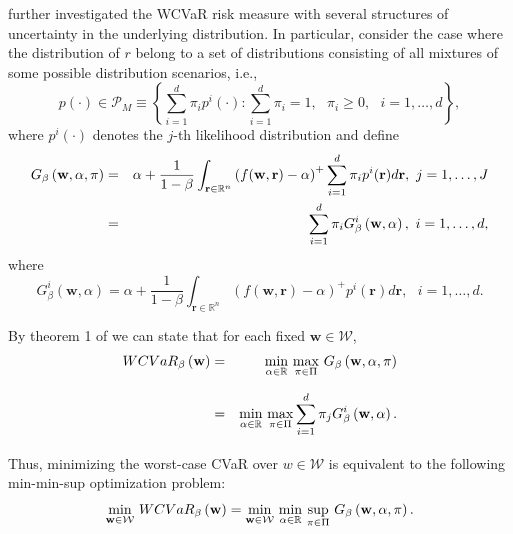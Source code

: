 \documentclass[a4paper,10pt]{article}
\begin{document}
\citet*{zhu2009worst} further investigated the WCVaR risk measure with several structures of uncertainty in the underlying distribution. In particular, \citet*{zhu2009worst} consider the case where the distribution of $r$ belong to a set of distributions consisting of all mixtures of some possible distribution scenarios, i.e.,
\begin{equation}
p\left( \cdot \right) \in \mathcal{P}_{M}\equiv \left\{ \sum_{i=1}^{d}\pi_{i}p^{i}\left( \cdot \right) :\sum_{i=1}^{d}\pi _{i}=1,\text{ }\pi _{i}\geq 0,\text{ }i=1,\ldots,d\right\},\label{15}
\end{equation}
where $p^{i}\left( \cdot \right) $ denotes the $j$-th likelihood distribution and define
\begin{eqnarray}
G_{\beta }\left( \mathbf{w},\alpha ,\pi \right) &=&\alpha +\frac{1}{1-\beta }%
\int_{\mathbf{r}\in	\mathbb{R}^{n}}\left( f(\mathbf{w},\mathbf{r})-\alpha \right) ^{+}\sum_{i=1}^{d}\pi_{i}p^{i}(\mathbf{r})d\mathbf{r},\text{ }j=1,\ldots,J  \notag \\
&=&\sum_{i=1}^{d}\pi _{i}G_{\beta }^{i}\left( \mathbf{w},\alpha \right) ,%
\text{ }i=1,\ldots,d,  \label{16}
\end{eqnarray}
where
\begin{equation}
G_{\beta }^{i}\left( \mathbf{w},\alpha \right) =\alpha +\frac{1}{1-\beta }%
\int_{\mathbf{r}\in\mathbb{R}^{n}}\left( f(\mathbf{w},\mathbf{r})-\alpha \right) ^{+}p^{i}(\mathbf{r})d
\mathbf{r},\text{ }i=1,\ldots,d.  \label{17}
\end{equation}


By theorem 1 of \citet*{zhu2009worst} we can state that for each fixed $\mathbf{w}\in \mathcal{W}$, 
\begin{eqnarray}
WCVaR_{\beta }\left( \mathbf{w}\right) &=&\underset{}{\underset{\alpha \in\mathbb{R}}{\min }~\underset{\pi \in \Pi }{\max }}~G_{\beta }\left( \mathbf{w},\alpha
,\pi \right)  \notag \\
&=&\underset{}{\underset{\alpha \in	\mathbb{R}}{\min }~\underset{\pi \in \Pi }{\max }}\sum_{i=1}^{d}\pi _{j}G_{\beta
}^{i}\left( \mathbf{w},\alpha \right).  \label{18}
\end{eqnarray}%

Thus, minimizing the worst-case CVaR over $w\in \mathcal{W}$ is equivalent to the following min-min-sup optimization problem:
\begin{equation}
\underset{}{\underset{\mathbf{w}\in \mathcal{W}}{\min }}~WCVaR_{\beta
}\left( \mathbf{w}\right) =\underset{}{\underset{\mathbf{w}\in \mathcal{W}}{%
		\min }~\underset{\alpha \in	\mathbb{R}}{\min }~\underset{\pi \in \Pi }{\sup }}~G_{\beta }\left( \mathbf{w},\alpha,\pi \right) .  \label{19}
\end{equation}
\end{document}
